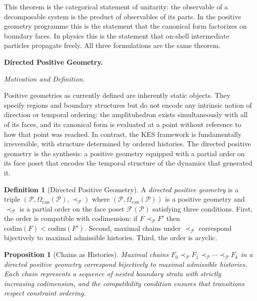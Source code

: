 \documentclass[12pt, oneside]{amsart}
\theoremstyle{plain}
\newtheorem{proposition}[theorem]{Proposition}
\theoremstyle{definition}
\newtheorem{definition}[theorem]{Definition}
\theoremstyle{remark}
\newcommand{\CF}{\Omega_{\mathrm{can}}}
\begin{document}
This theorem is the categorical statement of unitarity: the observable of a decomposable system is the product of observables of its parts. In the positive geometry programme this is the statement that the canonical form factorizes on boundary faces. In physics this is the statement that on-shell intermediate particles propagate freely. All three formulations are the same theorem.

\bigskip\noindent\textbf{Directed Positive Geometry.}
\label{sec:directed}

\medskip\noindent\textit{Motivation and Definition.}

Positive geometries as currently defined are inherently static objects. They specify regions and boundary structures but do not encode any intrinsic notion of direction or temporal ordering: the amplituhedron exists simultaneously with all of its faces, and its canonical form is evaluated at a point without reference to how that point was reached. In contrast, the KES framework is fundamentally irreversible, with structure determined by ordered histories. The directed positive geometry is the synthesis: a positive geometry equipped with a partial order on its face poset that encodes the temporal structure of the dynamics that generated it.

\begin{definition}[Directed Positive Geometry]
\label{def:dpg}
A \emph{directed positive geometry} is a triple $(\mathcal{P}, \CF(\mathcal{P}), \prec_{\mathcal{P}})$ where $(\mathcal{P}, \CF(\mathcal{P}))$ is a positive geometry and $\prec_{\mathcal{P}}$ is a partial order on the face poset $\mathcal{F}(\mathcal{P})$ satisfying three conditions. First, the order is compatible with codimension: if $F \prec_{\mathcal{P}} F'$ then $\mathrm{codim}(F) < \mathrm{codim}(F')$. Second, maximal chains under $\prec_{\mathcal{P}}$ correspond bijectively to maximal admissible histories. Third, the order is acyclic.
\end{definition}

\begin{proposition}[Chains as Histories]
Maximal chains $F_0 \prec_{\mathcal{P}} F_1 \prec_{\mathcal{P}} \cdots \prec_{\mathcal{P}} F_k$ in a directed positive geometry correspond bijectively to maximal admissible histories. Each chain represents a sequence of nested boundary strata with strictly increasing codimension, and the compatibility condition ensures that transitions respect constraint ordering.
\end{proposition}
\end{document}
